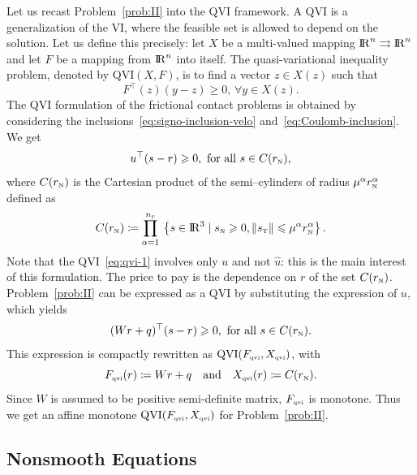 {Let us recast Problem~\ref{prob:II} into the QVI framework. A QVI is a generalization of the VI, where the feasible set is allowed to depend on the solution. Let us define this precisely:
let $X$ be a multi-valued mapping  $\mathrm{I\!R}^{n} \rightrightarrows \mathrm{I\!R}^{n}$ and let  $F$ be a mapping from $\mathrm{I\!R}^n$ into itself.
The  quasi-variational inequality  problem, denoted by $\mathrm{QVI}(X,F)$, is to find a vector $z\in X(z)$ such that 
\begin{equation}
 \label{eq:qvi}
 F^{\top}(z) (y-z) \ge 0, \, \forall y \in X(z).
\end{equation}
The QVI formulation of the frictional contact problems is obtained by considering the inclusions~\eqref{eq:signo-inclusion-velo} and~\eqref{eq:Coulomb-inclusion}. We get 
\begin{equation}
  \label{eq:qvi-1}
  u^\top (s - r) \geq 0, \text{ for all } s \in C(r_\n),
\end{equation}
where $C( r_{\hbox{\tiny{N}}})$ is the Cartesian product of the semi--cylinders of radius $\mu^\alpha r_{\hbox{\tiny{N}}}^\alpha$ defined as
\begin{equation}
  \label{eq:cylinder}
  C(r_\n) \coloneqq \prod_{\alpha =1}^{n_c}\: \left\{ s \in \RR^3 \mid  s_\n \geq 0, \|s_\t\| \leq \mu^\alpha r^\alpha_\n\right\}.
\end{equation}
Note that the QVI~\eqref{eq:qvi-1} involves only $u$ and not $\hat u$: this is the main interest of this formulation. The price to pay is the dependence on $r$ of the set $C(r_{\hbox{\tiny{N}}})$.
Problem~\ref{prob:II} can be expressed as a QVI by substituting the expression of $u$, which yields
\begin{equation}
  \label{eq:qvi-IIbis}
   (Wr+q)^\top (s - r) \geq 0, \text{ for all } s \in C(r_\n).
\end{equation}
This expression is compactly rewritten as $\mathrm{QVI}(F_{{\hbox{\tiny{qvi}}}},X_{{\hbox{\tiny{qvi}}}})$, with 
\begin{equation}
  \label{eq:qvi-II}
  F_{\qvitwo}(r) \coloneqq  Wr+q \quad\text{and}\quad X_{\qvitwo}(r) \coloneqq C(r_\n) .
\end{equation}
Since $W$ is assumed to be positive semi-definite matrix, $F_{{\hbox{\tiny{qvi}}}}$ is monotone. Thus we get an affine monotone $\mathrm{QVI}(F_{{\hbox{\tiny{qvi}}}},X_{{\hbox{\tiny{qvi}}}})$ for Problem~\ref{prob:II}.


\subsection{Nonsmooth Equations}
\label{Sec:NonsmoothEquations}

}
